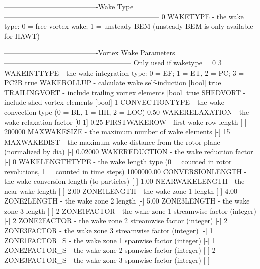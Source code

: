\begin{cfgcode}
----------------------------------------Wake Type------------------------------------------------------------------
0                                                  WAKETYPE           - the wake type: 0 = free vortex wake; 1 = unsteady BEM (unsteady BEM is only available for HAWT)

----------------------------------------Vortex Wake Parameters------------------------------------------------------
Only used if waketype = 0
3                                                  WAKEINTTYPE        - the wake integration type: 0 = EF; 1 = ET, 2 = PC; 3 = PC2B
true                                               WAKEROLLUP         - calculate wake self-induction [bool]
true                                               TRAILINGVORT       - include trailing vortex elements [bool]
true                                               SHEDVORT           - include shed vortex elements [bool]
1                                                  CONVECTIONTYPE     - the wake convection type (0 = BL, 1 = HH, 2 = LOC)
0.50                                               WAKERELAXATION     - the wake relaxation factor [0-1]
0.25                                               FIRSTWAKEROW       - first wake row length [-]
200000                                             MAXWAKESIZE        - the maximum number of wake elements [-]
15                                                 MAXWAKEDIST        - the maximum wake distance from the rotor plane (normalized by dia) [-]
0.02000                                            WAKEREDUCTION      - the wake reduction factor [-]
0                                                  WAKELENGTHTYPE     - the wake length type (0 = counted in rotor revolutions, 1 = counted in time steps)
1000000.00                                         CONVERSIONLENGTH   - the wake conversion length (to particles) [-]
1.00                                               NEARWAKELENGTH     - the near wake length [-]
2.00                                               ZONE1LENGTH        - the wake zone 1 length [-]
4.00                                               ZONE2LENGTH        - the wake zone 2 length [-]
5.00                                              ZONE3LENGTH        - the wake zone 3 length [-]
2                                                  ZONE1FACTOR        - the wake zone 1 streamwise factor (integer) [-]
2                                                  ZONE2FACTOR        - the wake zone 2 streamwise factor (integer) [-]
2                                                  ZONE3FACTOR        - the wake zone 3 streamwise factor (integer) [-]
1                                                  ZONE1FACTOR_S      - the wake zone 1 spanwise factor (integer) [-]
1                                                  ZONE2FACTOR_S      - the wake zone 2 spanwise factor (integer) [-]
2                                                  ZONE3FACTOR_S      - the wake zone 3 spanwise factor (integer) [-]


\end{cfgcode}
